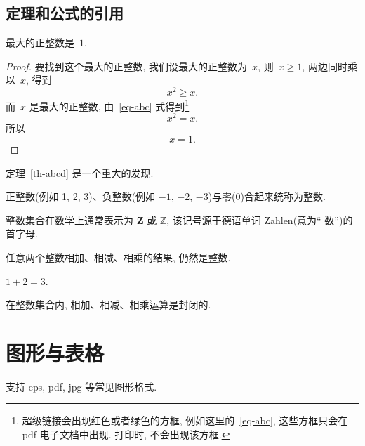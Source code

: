\documentclass{WHUPhd}  %
\begin{document}
\subsection{定理和公式的引用}

\begin{theorem}[谁发现的]\label{th-abcd}
最大的正整数是~$1$.
\end{theorem}

\begin{proof}
要找到这个最大的正整数, 我们设最大的正整数为~$x$, 则~$x \geqslant 1$, 两边同时乘以~$x$, 得到
\begin{equation}\label{eq-abc}
x^2 \geqslant x.
\end{equation}
而~$x$ 是最大的正整数, 由~\eqref{eq-abc} 式得到\footnote{超级链接会出现红色或者绿色的方框, 例如这里的~\eqref{eq-abc}, 这些方框只会在 pdf 电子文档中出现. 打印时, 不会出现该方框.}
\[
x^2 = x.
\]
所以
\begin{equation*}
x = 1.
\end{equation*}
\end{proof}

定理~\ref{th-abcd} 是一个重大的发现.

\begin{definition}[整数]
 正整数(例如 1, 2, 3)、负整数(例如 ${−1}$, $−2$, $−3$)与零(0)合起来统称为{\heiti 整数}.
\end{definition}

\begin{remark}
  整数集合在数学上通常表示为 $\mathbf{Z}$ 或 $\mathbb{Z}$, 该记号源于德语单词 Zahlen(意为`` 数'')的首字母.
\end{remark}

\begin{proposition}
任意两个整数相加、相减、相乘的结果, 仍然是整数.
\end{proposition}

\begin{example}
  $1+2=3$.
\end{example}

\begin{corollary}
   在整数集合内, 相加、相减、相乘运算是封闭的.
\end{corollary}

\section{图形与表格}

支持 eps, pdf, jpg 等常见图形格式.
\end{document}
